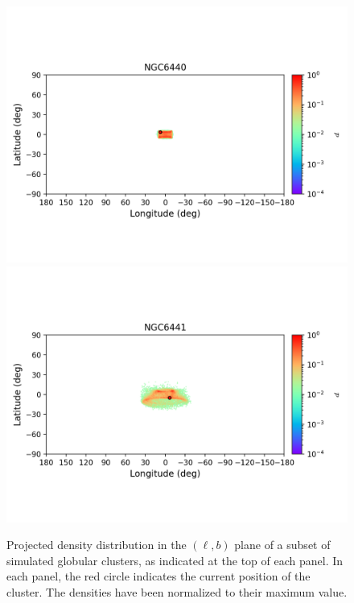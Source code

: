 \begin{figure}
\begin{center}
                \includegraphics[clip=true, trim = 0mm 20mm 0mm 10mm, width=1\columnwidth]{images/error_plots_NGC6440.png}
                \includegraphics[clip=true, trim = 0mm 20mm 0mm 10mm, width=1\columnwidth]{images/error_plots_NGC6441.png}
            \end{center}
            \caption[]{Projected density distribution in the $(\ell, b)$ plane of a subset of simulated globular clusters, as indicated at the top of each panel. In each panel, the red circle indicates the current position of the cluster. The densities have been normalized to their maximum value.}\label{stream11}
        \end{figure}
        
